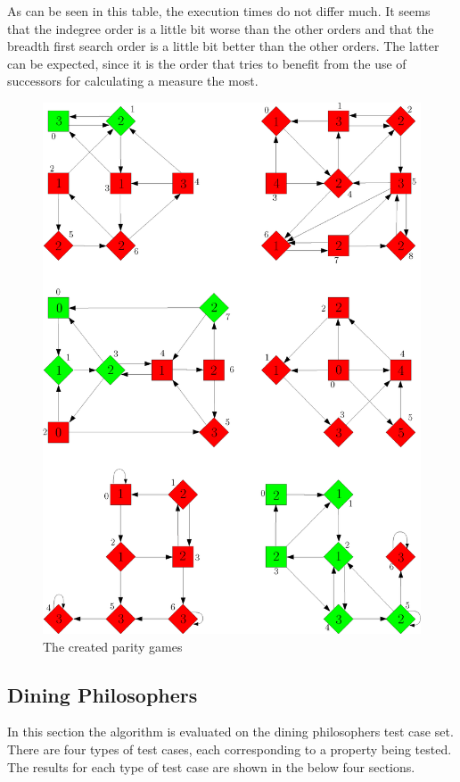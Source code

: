 \documentclass[10pt,a4paper]{article}
\begin{document}
As can be seen in this table, the execution times do not differ much. It seems that the indegree order is a little bit worse than the other orders and that the breadth first search order is a little bit better than the other orders. The latter can be expected, since it is the order that tries to benefit from the use of successors for calculating a measure the most.

\begin{figure}
\centering
\includegraphics[width=\textwidth]{paritygames.png}
\caption{The created parity games}
\label{paritygames}
\end{figure}


\subsection{Dining Philosophers}
In this section the algorithm is evaluated on the dining philosophers test case set. There are four types of test cases, each corresponding to a property being tested. The results for each type of test case are shown in the below four sections.
\end{document}
